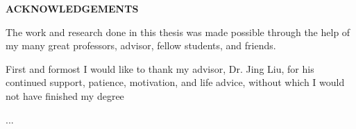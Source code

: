 \clearpage
\begin{centering}
\textbf{ACKNOWLEDGEMENTS}\\
\vspace{\baselineskip}
\end{centering}

The work and research done in this thesis was made possible through the help of my many great professors, advisor, fellow students, and friends.

First and formost I would like to thank my advisor, Dr. Jing Liu, for his continued support, patience, motivation, and life advice, without which I would not have finished my degree

...
\clearpage
